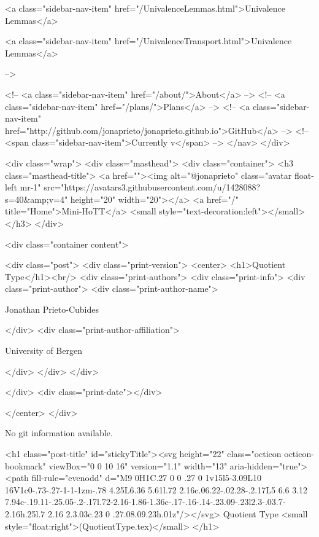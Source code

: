           <a class="sidebar-nav-item" href="/UnivalenceLemmas.html">Univalence Lemmas</a>
        
      
    
      
        
          <a class="sidebar-nav-item" href="/UnivalenceTransport.html">Univalence Lemmas</a>
        
      
     -->

    <!-- <a class="sidebar-nav-item" href="/about/">About</a> -->
    <!-- <a class="sidebar-nav-item" href="/plans/">Plans</a> -->
    <!-- <a class="sidebar-nav-item" href="http://github.com/jonaprieto/jonaprieto.github.io">GitHub</a> -->
    <!-- <span class="sidebar-nav-item">Currently v</span> -->
  </nav>
</div>

    <div class="wrap">
      <div class="masthead">
        <div class="container">
          <h3 class="masthead-title">
            <a href=""><img alt="@jonaprieto" class="avatar float-left mr-1" src="https://avatars3.githubusercontent.com/u/1428088?s=40&amp;v=4" height="20" width="20"></a>
            <a href="/" title="Home">Mini-HoTT</a>
            <small style="text-decoration:left"></small>
          </h3>
        </div>
      
      <div class="container content">
        







<div class="post">
  <div class="print-version">
    <center>
      <h1>Quotient Type</h1><br/>
        <div class="print-authors">
          <div class="print-info">
            <div class="print-author">
              <div class="print-author-name">
                
                  Jonathan Prieto-Cubides
                
              </div>
              <div class="print-author-affiliation">
                
                  University of Bergen
                
                </div>
            </div>
          </div>
          
          
        </div>
        <div class="print-date"></div>
        
        
    </center>
  </div>

  
  No git information available.
  

  <h1 class="post-title" id="stickyTitle"><svg height="22" class="octicon octicon-bookmark" viewBox="0 0 10 16" version="1.1" width="13" aria-hidden="true"><path fill-rule="evenodd" d="M9 0H1C.27 0 0 .27 0 1v15l5-3.09L10 16V1c0-.73-.27-1-1-1zm-.78 4.25L6.36 5.61l.72 2.16c.06.22-.02.28-.2.17L5 6.6 3.12 7.94c-.19.11-.25.05-.2-.17l.72-2.16-1.86-1.36c-.17-.16-.14-.23.09-.23l2.3-.03.7-2.16h.25l.7 2.16 2.3.03c.23 0 .27.08.09.23h.01z"/></svg> Quotient Type <small style="float:right">(QuotientType.tex)</small>
  </h1>

